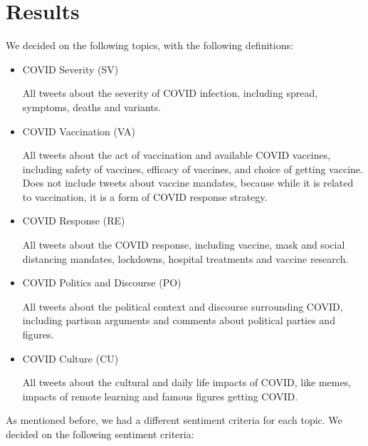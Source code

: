 \documentclass[letterpaper]{article} %
\begin{document}
\section{Results}
We decided on the following topics, with the following definitions: 
\begin{itemize}
    \item COVID Severity (SV) \par
    All tweets about the severity of COVID infection, including spread, symptoms, deaths and variants. 
    \item COVID Vaccination (VA) \par
    All tweets about the act of vaccination and available COVID vaccines, including safety of vaccines, efficacy of vaccines, and choice of getting vaccine. Does not include tweets about vaccine mandates, because while it is related to vaccination, it is a form of COVID response strategy. 
    \item COVID Response (RE) \par
    All tweets about the COVID response, including vaccine, mask and social distancing mandates, lockdowns, hospital treatments and vaccine research. 
    \item COVID Politics and Discourse (PO) \par
    All tweets about the political context and discourse surrounding COVID, including partisan arguments and comments about political parties and figures. 
    \item COVID Culture (CU) \par
    All tweets about the cultural and daily life impacts of COVID, like memes, impacts of remote learning and famous figures getting COVID. 
\end{itemize}
As mentioned before, we had a different sentiment criteria for each topic. We decided on the following sentiment criteria: 
\end{document}
